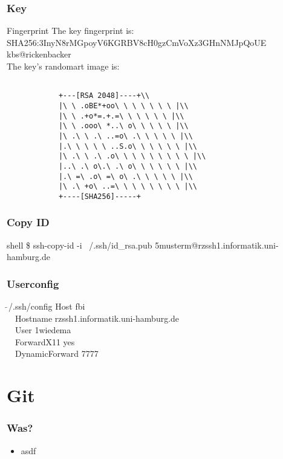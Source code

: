 \documentclass{beamer}
\begin{document}
    \begin{frame}
        \frametitle{Key}
        \begin{block}{Fingerprint}
            The key fingerprint is: \\
            SHA256:3InyN8rMGpoyV6KGRBV8cH0gzCmVoXz3GHnNMJpQoUE kbs@rickenbacker\\
            The key's randomart image is:\\
            \begin{verbatim}

            +---[RSA 2048]----+\\
            |\ \ .oBE*+oo\ \ \ \ \ \ \ |\\
            |\ \ .+o*=.+.=\ \ \ \ \ \ |\\
            |\ \ .ooo\ *..\ o\ \ \ \ \ |\\
            |\ .\ \ .\ ..=o\ .\ \ \ \ \ |\\
            |.\ \ \ \ \ ..S.o\ \ \ \ \ \ |\\
            |\ .\ \ .\ .o\ \ \ \ \ \ \ \ \ |\\
            |..\ .\ o\.\ .\ o\ \ \ \ \ \ |\\
            |.\ =\ .o\ =\ o\ .\ \ \ \ \ |\\
            |\ .\ +o\ ..=\ \ \ \ \ \ \ \ |\\
            +----[SHA256]-----+
        \end{verbatim}
        \end{block}
    \end{frame}
    \begin{frame}
        \frametitle{Copy ID}
        \begin{block}{shell}
            \small{\$ ssh-copy-id -i ~/.ssh/id\_rsa.pub 5musterm@rzssh1.informatik.uni-hamburg.de}

        \end{block}
    \end{frame}
    \begin{frame}
        \frametitle{Userconfig}
        \begin{block}{$\tilde \ $/.ssh/config}
            Host fbi\\
            \    \    Hostname rzssh1.informatik.uni-hamburg.de\\
            \    \   User 1wiedema\\
            \    \    ForwardX11 yes\\
            \    \    DynamicForward 7777\\
        \end{block}
    \end{frame}
\section{Git}
\begin{frame}
    \frametitle{Was?}
    \begin{itemize}
        \item asdf
    \end{itemize}
\end{frame}
\end{document}
